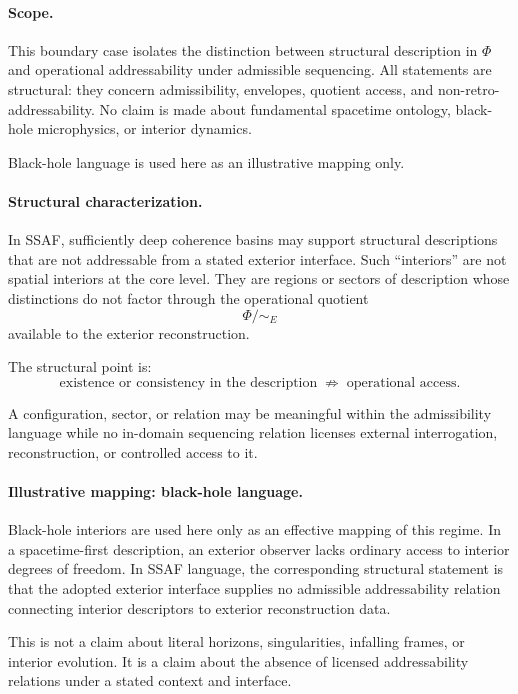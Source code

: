 \documentclass[aps,prx,onecolumn,11pt]{revtex4-2}
\theoremstyle{plain}
\theoremstyle{definition}
\theoremstyle{remark}
\begin{document}
\paragraph{Scope.}

This boundary case isolates the distinction between structural
description in \(\Phi\) and operational addressability under admissible
sequencing. All statements are structural: they concern admissibility,
envelopes, quotient access, and non-retro-addressability. No claim is
made about fundamental spacetime ontology, black-hole microphysics, or
interior dynamics.

Black-hole language is used here as an illustrative mapping only.

\paragraph{Structural characterization.}

In SSAF, sufficiently deep coherence basins may support structural
descriptions that are not addressable from a stated exterior interface.
Such ``interiors'' are not spatial interiors at the core level. They
are regions or sectors of description whose distinctions do not factor
through the operational quotient
\[
\Phi/{\sim_E}
\]
available to the exterior reconstruction.

The structural point is:
\[
\text{existence or consistency in the description}
\;\not\Rightarrow\;
\text{operational access}.
\]

A configuration, sector, or relation may be meaningful within the
admissibility language while no in-domain sequencing relation licenses
external interrogation, reconstruction, or controlled access to it.

\paragraph{Illustrative mapping: black-hole language.}

Black-hole interiors are used here only as an effective mapping of this
regime. In a spacetime-first description, an exterior observer lacks
ordinary access to interior degrees of freedom. In SSAF language, the
corresponding structural statement is that the adopted exterior
interface supplies no admissible addressability relation connecting
interior descriptors to exterior reconstruction data.

This is not a claim about literal horizons, singularities, infalling
frames, or interior evolution. It is a claim about the absence of
licensed addressability relations under a stated context and interface.
\end{document}

